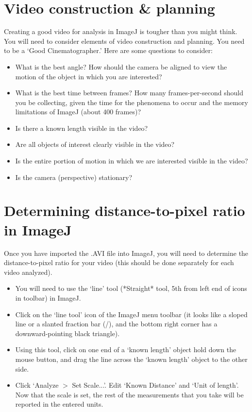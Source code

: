 \section*{Video construction \& planning}
Creating a good video for analysis in ImageJ is tougher than you might think. 
You will need to consider elements of video construction and planning. 
You need to be a ‘Good Cinematographer.’ 
Here are some questions to consider:
\begin{itemize}
\item What is the best angle? How should the camera be aligned to view the motion of the object
in which you are interested?
\item What is the best time between frames? How many frames-per-second should you be collecting, given the time for the phenomena to occur and the memory limitations of ImageJ (about 400 frames)?
\item Is there a known length visible in the video?
\item Are all objects of interest clearly visible in the video?
\item Is the entire portion of motion in which we are interested visible in the video?
\item Is the camera (perspective) stationary?
\end{itemize}

\section*{Determining distance-to-pixel ratio in ImageJ}
Once you have imported the .AVI file into ImageJ, you will need to determine the distance-to-pixel ratio for your video (this should be done separately for each video analyzed). 
\begin{itemize}
\item You will need to use the `line' tool (*Straight* tool, 5th from left end of icons in toolbar) in ImageJ.
\item Click on the `line tool' icon of the ImageJ menu toolbar (it looks like a sloped line or a slanted fraction bar (/), and the bottom right corner has a downward-pointing black triangle). 
\item Using this tool, click on one end of a `known length’ object hold down the mouse button, and drag the line across the `known length’ object to the other side. 
\item Click `Analyze $>$ Set Scale...'. Edit `Known Distance' and `Unit of length'. Now that the scale is set, the rest of the measurements that you take will be reported in the entered units.
\end{itemize}
